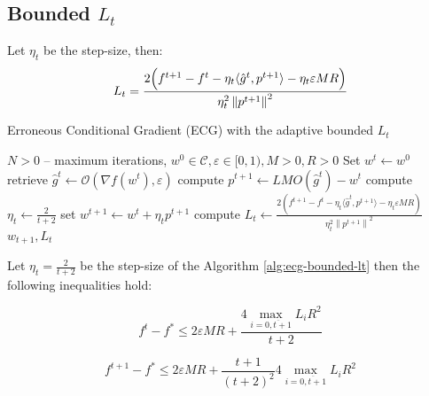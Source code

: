 \documentclass[runningheads, draft]{llncs}
\newcommand{\norm}[1]{\left\lVert#1\right\rVert}
\newcommand{\vprod}[1]{\langle#1\rangle}
\newcommand{\errgrad}{\hat{g}}
\begin{document}
\subsection{Bounded $L_t$}
%
\begin{lemma}\label{lemma:aecg-bounded-lt}Let $\eta_t$ be the step-size, then:
    \begin{equation}
        L_t = \frac{2\Bigl(f^{t+1} - f^t - \eta_t\vprod{\errgrad^t,p^{t+1}} -
            \eta_t \varepsilon M R\Bigr)}
        {\eta_t^2\norm{p^{t+1}}^2}
    \end{equation}
\end{lemma}
%
\begin{algorithm}[!ht]
    \caption{Erroneous Conditional Gradient (ECG) with the adaptive bounded
        $L_t$}
    \begin{algorithmic}[1]
        \REQUIRE $N > 0$ -- maximum iterations, $w^0 \in \mathcal{C},
            \varepsilon \in [0, 1), M > 0, R > 0$\;
        \STATE Set $w^t \leftarrow w^0$\;
        \STATE retrieve $\hat{g}^t \leftarrow \mathcal{O}(\nabla f(w^t), \varepsilon)$\;
        \STATE compute $p^{t+1} \leftarrow LMO(\hat{g}^t) - w^t$
        \STATE compute $\eta_t \leftarrow \frac{2}{t+2}$\;
        \STATE set $w^{t+1} \leftarrow w^t + \eta_t p^{t+1}$\;
        \STATE compute $L_t \leftarrow \frac{2(f^{t+1} - f^t -
            \eta_t\vprod{\errgrad^t,p^{t+1}} - \eta_t \varepsilon M R)}
            {\eta_t^2\norm{p^{t+1}}^2}$\;
        \ENDFOR
        \RETURN $w_{t+1}, L_t$
    \end{algorithmic}\label{alg:ecg-bounded-lt}
\end{algorithm}
%
\begin{theorem}Let $\eta_t = \frac{2}{t + 2}$ be the step-size of the
    Algorithm \ref{alg:ecg-bounded-lt} then the following inequalities hold:

    \begin{equation}\label{eq:aecg-convergence-rate-theorem-bounded-lt}
        f^t - f^* \leqslant 2 \varepsilon M R +
        \frac{4 \max\limits_{i=\overline{0,t+1}}L_i R^2}{t+2}
    \end{equation}

    \begin{equation}
        f^{t+1} - f^* \leqslant 2 \varepsilon M R +
        \frac{t + 1}{(t+2)^2}4 \max\limits_{i=\overline{0,t+1}}L_i R^2
    \end{equation}
\end{theorem}
%
\end{document}

